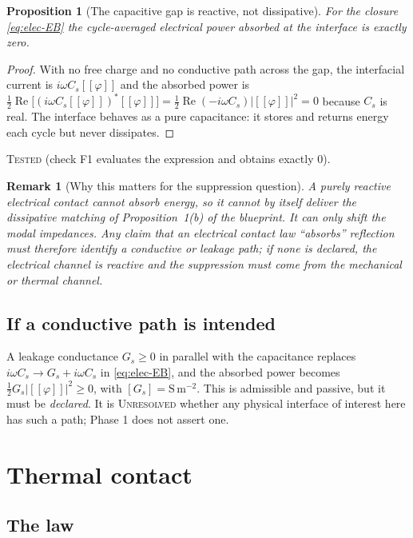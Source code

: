 \documentclass[11pt]{article}
\newcommand{\jmp}[1]{[\![#1]\!]}
\theoremstyle{plain}
\newtheorem{proposition}{Proposition}
\newtheorem{remark}{Remark}
\begin{document}
\begin{proposition}[The capacitive gap is reactive, not dissipative]
\label{prop:cap-reactive}
For the closure \eqref{eq:elec-EB} the cycle-averaged electrical power absorbed
at the interface is exactly zero.
\end{proposition}
\begin{proof}
With no free charge and no conductive path across the gap, the interfacial
current is $i\omega C_s\jmp{\varphi}$ and the absorbed power is
$\tfrac12\operatorname{Re}\big[(i\omega C_s\jmp{\varphi})^{*}\jmp{\varphi}\big]
= \tfrac12\operatorname{Re}(-i\omega C_s)\lvert\jmp{\varphi}\rvert^2 = 0$
because $C_s$ is real. The interface behaves as a pure capacitance: it stores and
returns energy each cycle but never dissipates.
\end{proof}
\textsc{Tested} (check F1 evaluates the expression and obtains exactly $0$).

\begin{remark}[Why this matters for the suppression question]
\label{rem:reactive}
A purely reactive electrical contact cannot \emph{absorb} energy, so it cannot by
itself deliver the dissipative matching of Proposition~1(b) of the blueprint. It
can only shift the modal impedances. Any claim that an electrical contact law
``absorbs'' reflection must therefore identify a conductive or leakage path;
if none is declared, the electrical channel is reactive and the suppression must
come from the mechanical or thermal channel.
\end{remark}

\subsection{If a conductive path is intended}
A leakage conductance $G_s\ge0$ in parallel with the capacitance replaces
$i\omega C_s \to G_s + i\omega C_s$ in \eqref{eq:elec-EB}, and the absorbed power
becomes $\tfrac12 G_s\lvert\jmp{\varphi}\rvert^2 \ge 0$, with
$[G_s]=\mathrm{S\,m^{-2}}$. This is admissible and passive, but it must be
\emph{declared}. It is \textsc{Unresolved} whether any physical interface of
interest here has such a path; Phase 1 does not assert one.

\section{Thermal contact}
\label{sec:therm}

\subsection{The law}
\end{document}
